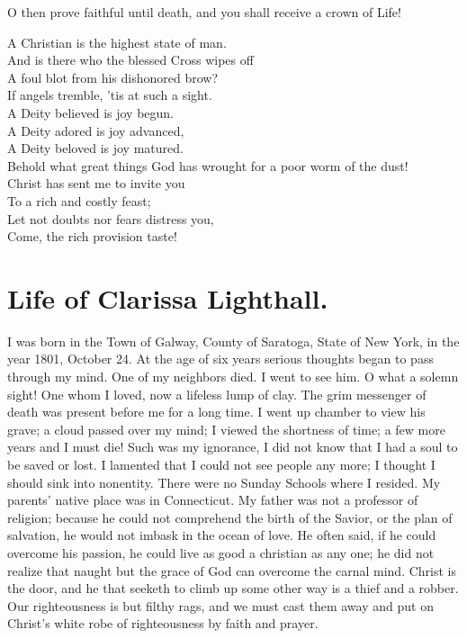 \documentclass{article}
\begin{document}
O then prove faithful until death, and you shall receive a crown of Life!
\begin{center}
A Christian is the highest state of man.\\
And is there who the blessed Cross wipes off\\
A foul blot from his dishonored brow?\\
If angels tremble, 'tis at such a sight.\\
A Deity believed is joy begun.\\
A Deity adored is joy advanced,\\
A Deity beloved is joy matured.\\
Behold what great things God has wrought for a poor worm of the dust!\\
Christ has sent me to invite you\\
To a rich and costly feast;\\
Let not doubts nor fears distress you,\\
Come, the rich provision taste!
\end{center}

\section*{Life of Clarissa Lighthall.}
I was born in the Town of Galway, County of Saratoga, State of New York, in the year 1801, October 24.
At the age of six years serious thoughts began to pass through my mind.
One of my neighbors died.
I went to see him.
O what a solemn sight!
One whom I loved, now a lifeless lump of clay.
The grim messenger of death was present before me for a long time.
I went up chamber to view his grave; a cloud passed over my mind; I viewed the shortness of time; a few more years and I must die!
Such was my ignorance, I did not know that I had a soul to be saved or lost.
I lamented that I could not see people any more; I thought I should sink into nonentity.
There were no Sunday Schools where I resided.
My parents' native place was in Connecticut.
My father was not a professor of religion; because he could not comprehend the birth of the Savior, or the plan of salvation, he would not imbask in the ocean of love.
He often said, if he could overcome his passion, he could live as good a christian as any one; he did not realize that naught but the grace of God can overcome the carnal mind.
Christ is the door, and he that seeketh to climb up some other way is a thief and a robber.
Our righteousness is but filthy rags, and we must cast them away and put on Christ's white robe of righteousness by faith and prayer.
\end{document}
